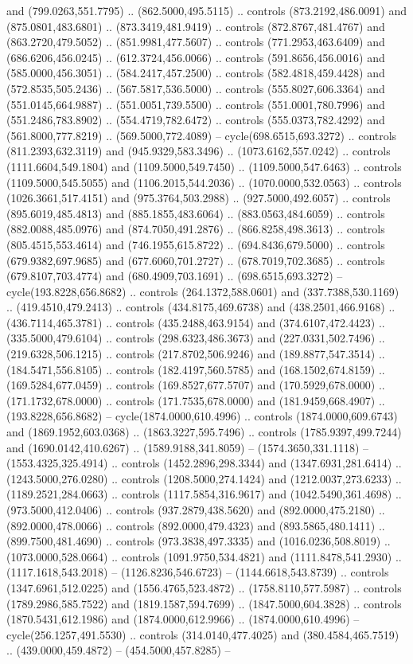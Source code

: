and (799.0263,551.7795) .. (862.5000,495.5115) .. controls (873.2192,486.0091) and (875.0801,483.6801) .. (873.3419,481.9419) .. controls (872.8767,481.4767) and (863.2720,479.5052) .. (851.9981,477.5607) .. controls (771.2953,463.6409) and (686.6206,456.0245) .. (612.3724,456.0066) .. controls (591.8656,456.0016) and (585.0000,456.3051) .. (584.2417,457.2500) .. controls (582.4818,459.4428) and (572.8535,505.2436) .. (567.5817,536.5000) .. controls (555.8027,606.3364) and (551.0145,664.9887) .. (551.0051,739.5500) .. controls (551.0001,780.7996) and (551.2486,783.8902) .. (554.4719,782.6472) .. controls (555.0373,782.4292) and (561.8000,777.8219) .. (569.5000,772.4089) -- cycle(698.6515,693.3272) .. controls (811.2393,632.3119) and (945.9329,583.3496) .. (1073.6162,557.0242) .. controls (1111.6604,549.1804) and (1109.5000,549.7450) .. (1109.5000,547.6463) .. controls (1109.5000,545.5055) and (1106.2015,544.2036) .. (1070.0000,532.0563) .. controls (1026.3661,517.4151) and (975.3764,503.2988) .. (927.5000,492.6057) .. controls (895.6019,485.4813) and (885.1855,483.6064) .. (883.0563,484.6059) .. controls (882.0088,485.0976) and (874.7050,491.2876) .. (866.8258,498.3613) .. controls (805.4515,553.4614) and (746.1955,615.8722) .. (694.8436,679.5000) .. controls (679.9382,697.9685) and (677.6060,701.2727) .. (678.7019,702.3685) .. controls (679.8107,703.4774) and (680.4909,703.1691) .. (698.6515,693.3272) -- cycle(193.8228,656.8682) .. controls (264.1372,588.0601) and (337.7388,530.1169) .. (419.4510,479.2413) .. controls (434.8175,469.6738) and (438.2501,466.9168) .. (436.7114,465.3781) .. controls (435.2488,463.9154) and (374.6107,472.4423) .. (335.5000,479.6104) .. controls (298.6323,486.3673) and (227.0331,502.7496) .. (219.6328,506.1215) .. controls (217.8702,506.9246) and (189.8877,547.3514) .. (184.5471,556.8105) .. controls (182.4197,560.5785) and (168.1502,674.8159) .. (169.5284,677.0459) .. controls (169.8527,677.5707) and (170.5929,678.0000) .. (171.1732,678.0000) .. controls (171.7535,678.0000) and (181.9459,668.4907) .. (193.8228,656.8682) -- cycle(1874.0000,610.4996) .. controls (1874.0000,609.6743) and (1869.1952,603.0368) .. (1863.3227,595.7496) .. controls (1785.9397,499.7244) and (1690.0142,410.6267) .. (1589.9188,341.8059) -- (1574.3650,331.1118) -- (1553.4325,325.4914) .. controls (1452.2896,298.3344) and (1347.6931,281.6414) .. (1243.5000,276.0280) .. controls (1208.5000,274.1424) and (1212.0037,273.6233) .. (1189.2521,284.0663) .. controls (1117.5854,316.9617) and (1042.5490,361.4698) .. (973.5000,412.0406) .. controls (937.2879,438.5620) and (892.0000,475.2180) .. (892.0000,478.0066) .. controls (892.0000,479.4323) and (893.5865,480.1411) .. (899.7500,481.4690) .. controls (973.3838,497.3335) and (1016.0236,508.8019) .. (1073.0000,528.0664) .. controls (1091.9750,534.4821) and (1111.8478,541.2930) .. (1117.1618,543.2018) -- (1126.8236,546.6723) -- (1144.6618,543.8739) .. controls (1347.6961,512.0225) and (1556.4765,523.4872) .. (1758.8110,577.5987) .. controls (1789.2986,585.7522) and (1819.1587,594.7699) .. (1847.5000,604.3828) .. controls (1870.5431,612.1986) and (1874.0000,612.9966) .. (1874.0000,610.4996) -- cycle(256.1257,491.5530) .. controls (314.0140,477.4025) and (380.4584,465.7519) .. (439.0000,459.4872) -- (454.5000,457.8285) -- 